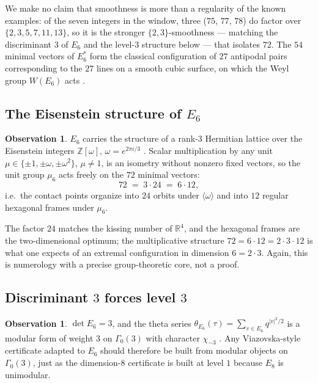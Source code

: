 \documentclass[11pt,reqno]{amsart}
\theoremstyle{plain}
\theoremstyle{definition}
\newtheorem{observation}[theorem]{Observation}
\theoremstyle{remark}
\newcommand{\R}{\mathbb{R}}
\newcommand{\Z}{\mathbb{Z}}
\begin{document}
We make no claim that smoothness is more than a regularity of the
known examples: of the seven integers in the window, three
($75$, $77$, $78$) do factor over $\{2,3,5,7,11,13\}$, so it is the
stronger $\{2,3\}$-smoothness --- matching the discriminant $3$ of
$E_6$ and the level-$3$ structure below --- that isolates $72$.  The
$54$ minimal vectors of $E_6^*$ form the classical configuration of
$27$ antipodal pairs corresponding to the $27$ lines on a smooth cubic
surface, on which the Weyl group $W(E_6)$ acts \cite{ConwaySloane1999}.

\subsection{The Eisenstein structure of \texorpdfstring{$E_6$}{E6}}

\begin{observation}\label{obs:eisenstein}
$E_6$ carries the structure of a rank-$3$ Hermitian lattice over the
Eisenstein integers $\Z[\omega]$, $\omega=e^{2\pi i/3}$
\cite{ConwaySloane1999}.  Scalar multiplication by any unit
$\mu\in\{\pm1,\pm\omega,\pm\omega^2\}$, $\mu\ne1$, is an isometry
without nonzero fixed vectors, so the unit group $\mu_6$ acts freely
on the $72$ minimal vectors:
\[
72\;=\;3\cdot 24\;=\;6\cdot 12 ,
\]
i.e.\ the contact points organize into $24$ orbits under
$\langle\omega\rangle$ and into $12$ regular hexagonal frames under
$\mu_6$.
\end{observation}

The factor $24$ matches the kissing number of $\R^4$, and the
hexagonal frames are the two-dimensional optimum; the multiplicative
structure $72=6\cdot12=2\cdot3\cdot12$ is what one expects of an
extremal configuration in dimension $6=2\cdot3$.  Again, this is
numerology with a precise group-theoretic core, not a proof.

\subsection{Discriminant \texorpdfstring{$3$}{3} forces level
\texorpdfstring{$3$}{3}}

\begin{observation}\label{obs:level}
$\det E_6=3$, and the theta series
$\theta_{E_6}(\tau)=\sum_{v\in E_6}q^{|v|^2/2}$ is a modular form of
weight $3$ on $\Gamma_0(3)$ with character $\chi_{-3}$
\cite{ConwaySloane1999,Ebeling2013}.  Any Viazovska-style certificate
adapted to $E_6$ should therefore be built from modular objects on
$\Gamma_0(3)$, just as the dimension-$8$ certificate is built at level
$1$ because $E_8$ is unimodular.
\end{observation}
\end{document}
